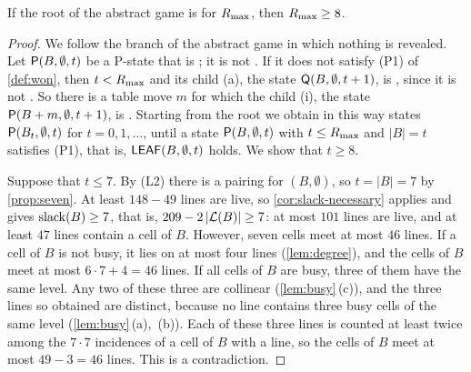 \begin{proposition}\label{prop:rmax8}
If the root of the abstract game is \WON{} for $R_{\max}$, then $R_{\max}\ge 8$.
\end{proposition}

\begin{proof}
We follow the branch of the abstract game in which nothing is revealed. Let $\mathsf{P}(B,\emptyset,t)$ be a
P-state that is \WON; it is not \VOID. If it does not satisfy (P1) of \cref{def:won}, then $t<R_{\max}$ and
its child \textup{(a)}, the state $\mathsf{Q}(B,\emptyset,t+1)$, is \WON, since it is not \VOID. So there is
a table move $m$ for which the child \textup{(i)}, the state $\mathsf{P}(B+m,\emptyset,t+1)$, is \WON.
Starting from the root we obtain in this way \WON{} states $\mathsf{P}(B_t,\emptyset,t)$ for $t=0,1,\dots$,
until a state $\mathsf{P}(B,\emptyset,t)$ with $t\le R_{\max}$ and $|B|=t$ satisfies (P1), that is,
$\mathsf{LEAF}(B,\emptyset,t)$ holds. We show that $t\ge 8$.

Suppose that $t\le 7$. By (L2) there is a pairing for $(B,\emptyset)$, so $t=|B|=7$ by
\cref{prop:seven}. At least $148-49$ lines are live, so \cref{cor:slack-necessary} applies and gives
$\operatorname{slack}(B)\ge 7$, that is, $209-2\,|\mathcal{L}(B)|\ge 7$: at most $101$ lines are live, and at least $47$ lines
contain a cell of $B$. However, seven cells meet at most $46$ lines. If a cell of $B$ is not busy, it lies on
at most four lines (\cref{lem:degree}), and the cells of $B$ meet at most $6\cdot 7+4=46$ lines. If all
cells of $B$ are busy, three of them have the same level. Any two of these three are collinear
(\cref{lem:busy}\,(c)), and the three lines so obtained are distinct, because no line contains three
busy cells of the same level (\cref{lem:busy}\,(a),~(b)). Each of these three lines is counted at least
twice among the $7\cdot 7$ incidences of a cell of $B$ with a line, so the cells of $B$ meet at most
$49-3=46$ lines. This is a contradiction.
\end{proof}

